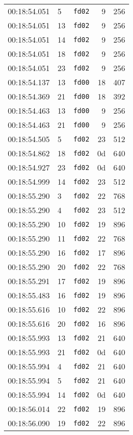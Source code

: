 \documentclass{article}
\begin{document}
\begin{longtable}{lllrr}
00:18:54.051 & 5 & \texttt{fd02} & 9 & 256 \\
00:18:54.051 & 13 & \texttt{fd02} & 9 & 256 \\
00:18:54.051 & 14 & \texttt{fd02} & 9 & 256 \\
00:18:54.051 & 18 & \texttt{fd02} & 9 & 256 \\
00:18:54.051 & 23 & \texttt{fd02} & 9 & 256 \\
00:18:54.137 & 13 & \texttt{fd00} & 18 & 407 \\
00:18:54.369 & 21 & \texttt{fd00} & 18 & 392 \\
00:18:54.463 & 13 & \texttt{fd00} & 9 & 256 \\
00:18:54.463 & 21 & \texttt{fd00} & 9 & 256 \\
00:18:54.505 & 5 & \texttt{fd02} & 23 & 512 \\
00:18:54.862 & 18 & \texttt{fd02} & 0d & 640 \\
00:18:54.927 & 23 & \texttt{fd02} & 0d & 640 \\
00:18:54.999 & 14 & \texttt{fd02} & 23 & 512 \\
00:18:55.290 & 3 & \texttt{fd02} & 22 & 768 \\
00:18:55.290 & 4 & \texttt{fd02} & 23 & 512 \\
00:18:55.290 & 10 & \texttt{fd02} & 19 & 896 \\
00:18:55.290 & 11 & \texttt{fd02} & 22 & 768 \\
00:18:55.290 & 16 & \texttt{fd02} & 17 & 896 \\
00:18:55.290 & 20 & \texttt{fd02} & 22 & 768 \\
00:18:55.291 & 17 & \texttt{fd02} & 19 & 896 \\
00:18:55.483 & 16 & \texttt{fd02} & 19 & 896 \\
00:18:55.616 & 10 & \texttt{fd02} & 22 & 896 \\
00:18:55.616 & 20 & \texttt{fd02} & 16 & 896 \\
00:18:55.993 & 13 & \texttt{fd02} & 21 & 640 \\
00:18:55.993 & 21 & \texttt{fd02} & 0d & 640 \\
00:18:55.994 & 4 & \texttt{fd02} & 21 & 640 \\
00:18:55.994 & 5 & \texttt{fd02} & 21 & 640 \\
00:18:55.994 & 14 & \texttt{fd02} & 0d & 640 \\
00:18:56.014 & 22 & \texttt{fd02} & 19 & 896 \\
00:18:56.090 & 19 & \texttt{fd02} & 22 & 896 \\

\end{longtable}
\end{document}
